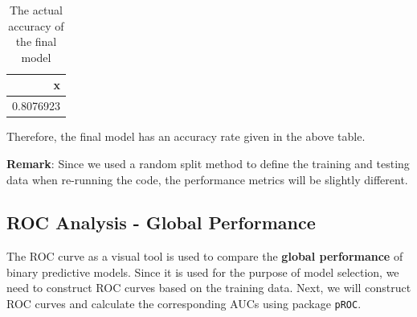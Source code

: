\documentclass[
]{book}
\newenvironment{Shaded}{\begin{snugshade}}{\end{snugshade}}
\newcommand{\AttributeTok}[1]{\textcolor[rgb]{0.13,0.29,0.53}{#1}}
\newcommand{\FloatTok}[1]{\textcolor[rgb]{0.00,0.00,0.81}{#1}}
\newcommand{\FunctionTok}[1]{\textcolor[rgb]{0.13,0.29,0.53}{\textbf{#1}}}
\newcommand{\NormalTok}[1]{#1}
\newcommand{\OtherTok}[1]{\textcolor[rgb]{0.56,0.35,0.01}{#1}}
\newcommand{\SpecialCharTok}[1]{\textcolor[rgb]{0.81,0.36,0.00}{\textbf{#1}}}
\newcommand{\StringTok}[1]{\textcolor[rgb]{0.31,0.60,0.02}{#1}}
\begin{document}
\begin{Shaded}
\end{Shaded}

\begin{table}

\caption{\label{tab:unnamed-chunk-151}The actual accuracy of the final model}
\centering
\begin{tabular}[t]{r}
\hline
x\\
\hline
0.8076923\\
\hline
\end{tabular}
\end{table}

Therefore, the final model has an accuracy rate given in the above table.

\textbf{Remark}: Since we used a random split method to define the training and testing data when re-running the code, the performance metrics will be slightly different.

\hypertarget{roc-analysis---global-performance}{%
\subsection{ROC Analysis - Global Performance}\label{roc-analysis---global-performance}}

The ROC curve as a visual tool is used to compare the \textbf{global performance} of binary predictive models. Since it is used for the purpose of model selection, we need to construct ROC curves based on the training data. Next, we will construct ROC curves and calculate the corresponding AUCs using package \texttt{pROC}.
\end{document}

